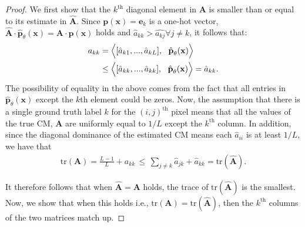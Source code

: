 \begin{proof}
We first show that the $k^{\text{th}}$ diagonal element in $\textbf{A}$ is smaller than or equal to its estimate in $\hat{\textbf{A}}$. Since $\textbf{p}(\textbf{x}) = \mathbf{e}_k$ is a one-hot vector, $\hat{\textbf{A}}\cdot \hat{\textbf{p}}_\theta(\textbf{x})=\textbf{A}\cdot \textbf{p}(\textbf{x}) $ holds and $\hat{a}_{kk} > \hat{a_{kj}} \forall j \neq k$, it follows that: 
\begin{align}\label{eq:side1}
    a_{kk} &= \Big{\langle} [\hat{a}_{k1},...,\hat{a}_{kL}], \ \ \hat{\textbf{p}}_\theta(\textbf{x}) \Big{\rangle} \\
    &\leq \Big{\langle} [\hat{a}_{kk}, ...,\hat{a}_{kk}], \ \ \hat{\textbf{p}}_\theta(\textbf{x})\Big{\rangle} = \hat{a}_{kk}. \label{eq:trace_inequality}
\end{align}
The possibility of equality in the above comes from the fact that all entries in $\hat{\textbf{p}}_\theta(\textbf{x})$ except the $k$th element could be zeros. Now, the assumption that there is a single ground truth label $k$ for the $(i, j)^{\text{th}}$ pixel means that all the values of the true CM, $\textbf{A}$ are uniformly equal to $1/L$ except the $k^{\text{th}}$ column. In addition, since the diagonal dominance of the estimated CM means each $\hat{a}_{ii}$ is at least $1/L$, we have that 
\begin{align*}
    \text{tr}(\textbf{A}) = \frac{L-1}{L} + a_{kk} \,\leq\,  \sum_{j\neq k}\hat{a}_{jk}  + \hat{a}_{kk} =  \text{tr}(\hat{\textbf{A}}).
\end{align*}

It therefore follows that when $\hat{\textbf{A}} = \textbf{A}$ holds, the trace of $\text{tr}(\hat{\textbf{A}})$ is the smallest. Now, we show that when this holds i.e., $\text{tr}(\textbf{A})= \text{tr}(\hat{\textbf{A}})$, then the $k^{\text{th}}$ columns of the two matrices match up. 


\end{proof}
